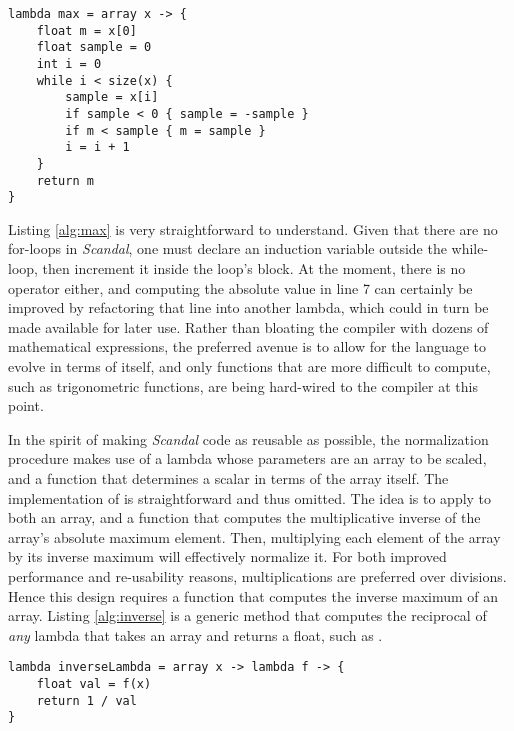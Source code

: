 \begin{lstlisting}[emph={lambda,array,float,int,while,size,if,return},emphstyle={\textbf},caption={Computing the maximum element of an array.},label={alg:max}]
lambda max = array x -> {
	float m = x[0]
	float sample = 0
	int i = 0
	while i < size(x) {
		sample = x[i]
		if sample < 0 { sample = -sample }
		if m < sample { m = sample }
		i = i + 1
	}
	return m
}
\end{lstlisting}

Listing \ref{alg:max} is very straightforward to understand. Given that there are no for-loops in \emph{Scandal}, one must declare an induction variable outside the while-loop, then increment it inside the loop's block. At the moment, there is no  operator either, and computing the absolute value in line 7 can certainly be improved by refactoring that line into another lambda, which could in turn be made available for later use. Rather than bloating the compiler with dozens of mathematical expressions, the preferred avenue is to allow for the language to evolve in terms of itself, and only functions that are more difficult to compute, such as trigonometric functions, are being hard-wired to the compiler at this point.

In the spirit of making \emph{Scandal} code as reusable as possible, the normalization procedure makes use of a  lambda whose parameters are an array to be scaled, and a function that determines a scalar in terms of the array itself. The implementation of  is straightforward and thus omitted. The idea is to apply to  both an array, and a function that computes the multiplicative inverse of the array's absolute maximum element. Then, multiplying each element of the array by its inverse maximum will effectively normalize it. For both improved performance and re-usability reasons, multiplications are preferred over divisions. Hence this design requires a function that computes the inverse maximum of an array. Listing \ref{alg:inverse} is a generic method that computes the reciprocal of \emph{any} lambda that takes an array and returns a float, such as .

\begin{lstlisting}[emph={lambda,array,float,return},emphstyle={\textbf},caption={Computing the inverse of an \il{array -> float} lambda.},label={alg:inverse}]
lambda inverseLambda = array x -> lambda f -> {
	float val = f(x)
	return 1 / val
}
\end{lstlisting}

